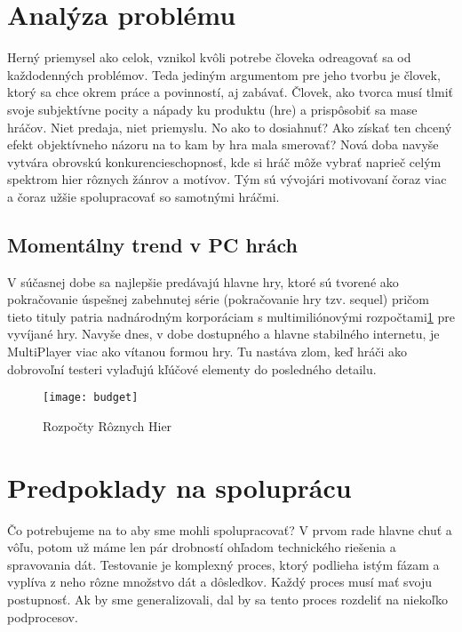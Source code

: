 \documentclass[10pt,twoside,slovak,a4paper]{article}
\begin{document}
\newpage
\section{Analýza problému } \label{analyza}

Herný priemysel\cite{Fullerton:Game} ako celok, vznikol kvôli potrebe človeka odreagovať sa od každodenných problémov. Teda jediným argumentom pre jeho tvorbu je človek, ktorý sa chce okrem práce a povinností, aj zabávať. Človek, ako tvorca musí tlmiť svoje subjektívne pocity a nápady ku produktu (hre) a prispôsobiť sa mase hráčov. Niet predaja, niet priemyslu. No ako to dosiahnuť? Ako získať ten chcený efekt objektívneho názoru na to kam by hra mala smerovať? Nová doba navyše vytvára obrovskú konkurencieschopnosť,  kde si hráč  môže vybrať naprieč celým spektrom hier rôznych žánrov a motívov. Tým sú vývojári motivovaní čoraz viac a čoraz užšie spolupracovať so samotnými hráčmi.

\subsection{Momentálny trend v PC hrách} \label{trend}
V súčasnej dobe sa najlepšie predávajú hlavne hry, ktoré sú tvorené ako pokračovanie úspešnej zabehnutej série \cite{Record} (pokračovanie hry tzv. sequel) pričom tieto tituly patria nadnárodným korporáciam s multimiliónovými rozpočtami\ref{fig:mesh1} pre vyvíjané hry. Navyše dnes, v dobe dostupného a hlavne stabilného internetu, je MultiPlayer viac ako vítanou formou hry. Tu nastáva zlom, keď hráči ako dobrovoľní testeri vylaďujú kľúčové elementy do posledného detailu.

\begin{figure}[h]
    \centering
    \texttt{[image: budget]}
    \caption{Rozpočty Rôznych Hier}
    \label{fig:mesh1}
\end{figure}

\section{Predpoklady na spoluprácu} \label{predpoklady}

Čo potrebujeme na to aby sme mohli spolupracovať?\cite{Fine:Beta} V prvom rade hlavne chuť a vôľu, potom už máme len pár drobností ohľadom technického riešenia  a spravovania dát. Testovanie je komplexný proces, ktorý podlieha istým fázam a vyplíva z neho rôzne množstvo dát a dôsledkov. Každý proces musí mať svoju postupnosť. Ak by sme generalizovali, dal by sa tento proces rozdeliť na niekoľko podprocesov.
\end{document}
